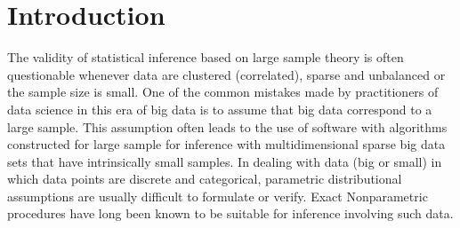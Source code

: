 \documentclass[12pt,oneside]{report}
\theoremstyle{definition}
\theoremstyle{mystyle}
\begin{document}
\singlespacing

\tableofcontents

\clearpage


\newpage
\doublespacing
\begin{center}
	\listoftables
\end{center}










\clearpage
\newpage
{}
\doublespacing

\chapter{Introduction}
The validity of statistical inference based on large sample theory is often questionable  whenever data are clustered (correlated), sparse and unbalanced or the sample size is small.
One of the common mistakes made by practitioners of data science in this era of big data is to assume that big data correspond to a large sample. This assumption often leads to the use of software with algorithms constructed for large sample for inference with multidimensional sparse big data sets that have intrinsically small samples. In dealing with data (big or small) in which data points are discrete and categorical, parametric distributional assumptions are usually difficult to formulate or verify. Exact Nonparametric procedures have long been known to be suitable for inference involving such data.
\end{document}
